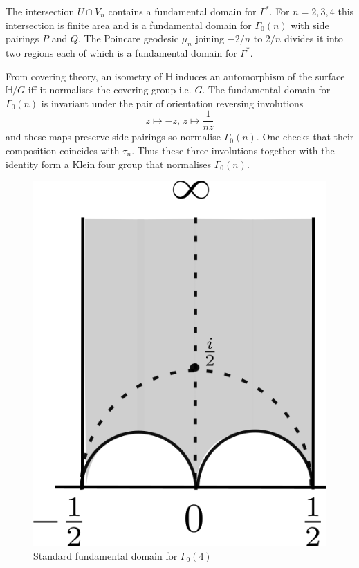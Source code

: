 \documentclass[12pt,a4paper]{amsart}
\def\HH{\mathbb{H}}
\begin{document}
The  intersection $U \cap V_n$ contains a fundamental
domain for $\Gamma^*$. 
For  $n = 2, 3, 4 $ this intersection is finite area and is a fundamental  domain for $\Gamma_0(n)$ with side pairings $P$ and $Q$.
The Poincare geodesic $\mu_n$ joining $-2/n$ to $2/n$ divides it into two regions each
of which is a fundamental domain for $\Gamma^*$.


From covering theory, an isometry  of $\HH$ 
induces an automorphism of  the  surface $\HH / G$ iff it normalises the covering group
i.e. $G$.
The fundamental domain for $\Gamma_0(n)$ is 
invariant under the  pair of orientation  reversing involutions 
$$ z \mapsto -\bar{z} ,\, z \mapsto \frac{1}{\bar{nz}} $$
and these maps preserve side pairings so normalise  $\Gamma_0(n)$.
One checks that their composition coincides with $\tau_n$.
Thus these three involutions together with the identity form a Klein four group 
that  normalises $\Gamma_0(n)$.

\begin{figure}[hb]
\begin{center}
\includegraphics[scale=.5]{fund_dom4.png} 
\end{center}
\caption{Standard fundamental domain for $\Gamma_0(4)$}
\label{fund4}
\end{figure}
\end{document}
